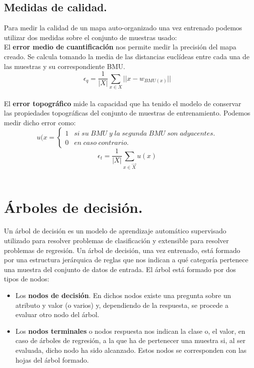 \subsection{Medidas de calidad.}
Para medir la calidad de un mapa auto-organizado una vez entrenado podemos utilizar dos medidas sobre el conjunto de muestras usado:\\

El \textbf{error medio de cuantificación} nos permite medir la precisión del mapa creado. Se calcula tomando la media de las distancias euclídeas entre cada una de las muestras y su correspondiente BMU.\\

$$
\epsilon_q = \frac{1}{|X|}\sum_{x \in X}{||x-w_{BMU(x)}||}
$$\\

El \textbf{error topográfico} mide la capacidad que ha tenido el modelo de conservar las propiedades topográficas del conjunto de muestras de entrenamiento. Podemos medir dicho error como:\\
$$
u(x = \left\{
\begin{array}{ll}
1 & si \; su \; BMU \; y \; la \; segunda \; BMU \; son \; adyacentes.\\
0 & en \; caso \; contrario.
\end{array}
\right.
$$
$$
\epsilon_t =  \frac{1}{|X|}\sum_{x \in \vec{X}} u(x)
$$\\

\section{Árboles de decisión.}
Un árbol de decisión \cite{arbol} es un modelo de aprendizaje automático supervisado utilizado para resolver problemas de clasificación y extensible para resolver problemas de regresión. Un árbol de decisión, una vez entrenado, está formado por una estructura jerárquica de reglas que nos indican a qué categoría pertenece una muestra del conjunto de datos de entrada. El árbol está formado por dos tipos de nodos:\\

\begin{itemize}
	\item Los \textbf{nodos de decisión}. En dichos nodos existe una pregunta sobre un atributo y valor (o varios) y, dependiendo de la respuesta, se procede a evaluar otro nodo del árbol.
	\item Los \textbf{nodos terminales} o nodos respuesta nos indican la clase o, el valor, en caso de árboles de regresión, a la que ha de pertenecer una muestra si, al ser evaluada, dicho nodo ha sido alcanzado. Estos nodos se corresponden con las hojas del árbol formado.
\end{itemize}


